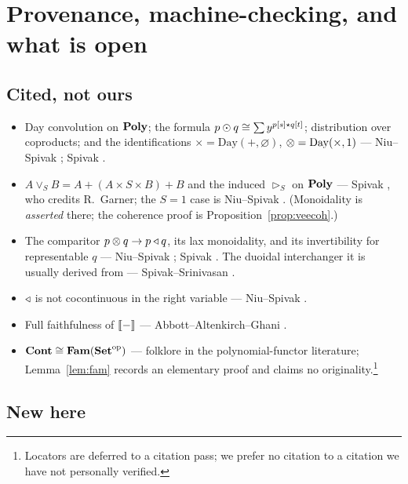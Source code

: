 \section{Provenance, machine-checking, and what is open}
\label{sec:provenance}

\subsection*{Cited, not ours}

\begin{itemize}[nosep]
\item Day convolution on $\mathbf{Poly}$; the formula
  $p\mathbin{\odot} q\cong\sum y^{p[s]\star q[t]}$; distribution over coproducts;
  and the identifications $\times=\mathrm{Day}(+,\varnothing)$,
  $\mathbin{\otimes}=\mathrm{Day}(\times,1)$ --- Niu--Spivak
  \cite[Prop.~3.79, eqs.~(3.80)--(3.81)]{NiuSpivak}; Spivak \cite{SpivakRef}.
\item $A\vee_S B=A+(A\times S\times B)+B$ and the induced $\rhd_S$ on $\mathbf{Poly}$ ---
  Spivak \cite[eqs.~(9),(12)]{SpivakRef}, who credits R.~Garner; the $S=1$ case
  is Niu--Spivak \cite[Ex.~3.82]{NiuSpivak}. (Monoidality is \emph{asserted}
  there; the coherence proof is Proposition~\ref{prop:veecoh}.)
\item The comparitor $p\mathbin{\otimes} q\to p\mathbin{\triangleleft} q$, its lax monoidality, and its
  invertibility for representable $q$ --- Niu--Spivak
  \cite[Ex.~6.84, Ex.~6.85, Prop.~6.87]{NiuSpivak}; Spivak
  \cite[eqs.~(32),(33)]{SpivakRef}. The duoidal interchanger it is usually
  derived from --- Spivak--Srinivasan \cite{SpivakSrinivasan}.
\item $\mathbin{\triangleleft}$ is not cocontinuous in the right variable --- Niu--Spivak
  \cite[Ex.~6.56]{NiuSpivak}.
\item Full faithfulness of $\llbracket - \rrbracket$ --- Abbott--Altenkirch--Ghani \cite{AAG05}.
\item $\mathbf{Cont}\cong\mathbf{Fam}(\mathbf{Set}^{\mathrm{op}})$ --- folklore in the polynomial-functor
  literature; Lemma~\ref{lem:fam} records an elementary proof and claims no
  originality.\footnote{Locators are deferred to a citation pass; we prefer no
  citation to a citation we have not personally verified.}
\end{itemize}

\subsection*{New here}


